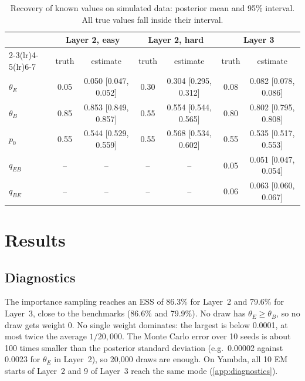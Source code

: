 \documentclass[12pt]{article}
\begin{document}
\begin{table}[h]
\centering
\small
\caption{Recovery of known values on simulated data: posterior mean and 95\% interval. All true values fall inside their interval.}
\label{tab:validation}
\begin{tabular}{@{}lcccccc@{}}
\toprule
 & \multicolumn{2}{c}{Layer 2, easy} & \multicolumn{2}{c}{Layer 2, hard} & \multicolumn{2}{c}{Layer 3} \\
\cmidrule(lr){2-3}\cmidrule(lr){4-5}\cmidrule(lr){6-7}
 & truth & estimate & truth & estimate & truth & estimate \\
\midrule
$\theta_E$ & 0.05 & 0.050 [0.047, 0.052] & 0.30 & 0.304 [0.295, 0.312] & 0.08 & 0.082 [0.078, 0.086] \\
$\theta_B$ & 0.85 & 0.853 [0.849, 0.857] & 0.55 & 0.554 [0.544, 0.565] & 0.80 & 0.802 [0.795, 0.808] \\
$p_0$      & 0.55 & 0.544 [0.529, 0.559] & 0.55 & 0.568 [0.534, 0.602] & 0.55 & 0.535 [0.517, 0.553] \\
$q_{EB}$   & -- & -- & -- & -- & 0.05 & 0.051 [0.047, 0.054] \\
$q_{BE}$   & -- & -- & -- & -- & 0.06 & 0.063 [0.060, 0.067] \\
\bottomrule
\end{tabular}
\end{table}

\section{Results}\label{sec:results}

\subsection{Diagnostics}

The importance sampling reaches an ESS of 86.3\% for Layer~2 and 79.6\% for Layer~3, close to the benchmarks (86.6\% and 79.9\%). No draw has $\theta_E \ge \theta_B$, so no draw gets weight 0. No single weight dominates: the largest is below 0.0001, at most twice the average $1/20{,}000$. The Monte Carlo error over 10 seeds is about 100 times smaller than the posterior standard deviation (e.g.\ 0.00002 against 0.0023 for $\theta_E$ in Layer~2), so 20{,}000 draws are enough. On Yambda, all 10 EM starts of Layer~2 and 9 of Layer~3 reach the same mode (\cref{app:diagnostics}).
\end{document}
